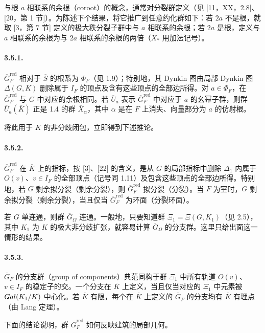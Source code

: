 与根 $a$ 相联系的余根（coroot）的概念，通常对分裂群定义（见 [11，XX，2.8]、[20，第 1 节]）。为陈述下个结果，将它推广到任意约化群如下：若 $2a$ 不是根，就取 [3，第 7 节] 定义的极大秩分裂子群中与 $a$ 相联系的余根；若 $2a$ 是根，定义与 $a$ 相联系的余根为与 $2a$ 相联系的余根的两倍（$X_*$ 用加法记号）。

\paragraph*{3.5.1.}$\overline G_F^{\mathrm{red}}$ 相对于 $\overline S$ 的根系为 $\Phi_F$（见 1.9）；特别地，其 Dynkin 图由局部 Dynkin 图 $\Delta(G,K)$ 删除属于 $I_F$ 的顶点及含有这些顶点的全部边所得。对 $a\in\Phi_F$，在 $\overline G_F^{\mathrm{red}}$ 与 $G$ 中对应的余根相同。若 $\overline U_a$ 表示 $\overline G_F^{\mathrm{red}}$ 中对应于 $a$ 的幺幂子群，则群 $\overline U_a(\overline K)$ 正是 1.4 的群 $\overline X_\alpha$，其中 $\alpha$ 是在 $F$ 上消失、向量部分为 $a$ 的仿射根。

将此用于 $K$ 的非分歧闭包，立即得到下述推论。

\paragraph*{3.5.2.}$\overline G_F^{\mathrm{red}}$ 在 $\overline K$ 上的指标，按 [3]、[22] 的含义，是从 $G$ 的局部指标中删除 $\Delta_1$ 内属于 $O(v)$、$v\in I_F$ 的全部顶点（记号同 1.11）及包含这些顶点的全部边所得。特别地，若 $G$ 剩余拟分裂（剩余分裂），则 $\overline G_F^{\mathrm{red}}$ 拟分裂（分裂）。当 $F$ 为室时，$G$ 剩余拟分裂（剩余分裂），当且仅当 $\overline G_F^{\mathrm{red}}$ 为环面（分裂环面）。

若 $G$ 单连通，则群 $\overline G_\Omega$ 连通。一般地，只要知道群 $\Xi_1=\Xi(G,K_1)$（见 2.5），其中 $K_1$ 为 $K$ 的极大非分歧扩张，就容易计算 $\overline G_\Omega$ 的分支群。这里只给出面这一情形的结果。

\paragraph*{3.5.3.}$\overline G_F$ 的分支群（group of components）典范同构于群 $\Xi_1$ 中所有轨道 $O(v)$、$v\in I_F$ 的稳定子的交。一个分支在 $\overline K$ 上定义，当且仅当对应的 $\Xi_1$ 中元素被 $Gal(K_1/K)$ 中心化。若 $\overline K$ 有限，每个在 $\overline K$ 上定义的 $\overline G_F$ 的分支均有 $\overline K$ 有理点（由 Lang 定理）。

下面的结论说明，群 $\overline G_F^{\mathrm{red}}$ 如何反映建筑的局部几何。

